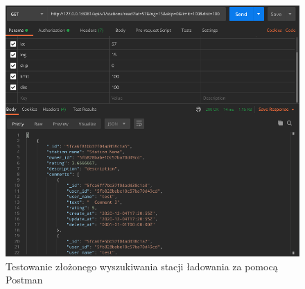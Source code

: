 \begin{figure}[ht]
    \centering
        \includegraphics[width=0.9\linewidth]{rys04/postman_station_find.png}
        \caption{Testowanie złożonego wyszukiwania stacji ładowania za pomocą Postman}
    \label{fig:postman_find_stations}
\end{figure}